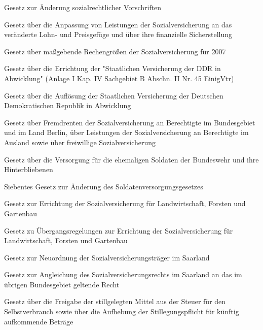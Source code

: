 \item[{SVÄndG}] Gesetz zur Änderung sozialrechtlicher Vorschriften

\item[{SVAnpG}] Gesetz über die Anpassung von Leistungen der Sozialversicherung an das veränderte Lohn- und Preisgefüge und über ihre finanzielle Sicherstellung

\item[{SVBezGrG-2007}] Gesetz über maßgebende Rechengrößen der Sozialversicherung für 2007

\item[{SVDDRAbwG}] Gesetz über die Errichtung der "Staatlichen Versicherung der DDR in Abwicklung" (Anlage I Kap. IV Sachgebiet B Abschn. II Nr. 45 EinigVtr)

\item[{SVDDRAuflG}] Gesetz über die Auflösung der Staatlichen Versicherung der Deutschen Demokratischen Republik in Abwicklung

\item[{SVFAG}] Gesetz über Fremdrenten der Sozialversicherung an Berechtigte im Bundesgebiet und im Land Berlin, über Leistungen der Sozialversicherung an Berechtigte im Ausland sowie über freiwillige Sozialversicherung

\item[{SVG}] Gesetz über die Versorgung für die ehemaligen Soldaten der Bundeswehr und ihre Hinterbliebenen

\item[{SVGÄndG-7}] Siebentes Gesetz zur Änderung des Soldatenversorgungsgesetzes

\item[{SVLFGG}] Gesetz zur Errichtung der Sozialversicherung für Landwirtschaft, Forsten und Gartenbau

\item[{SVLFÜG}] Gesetz zu Übergangsregelungen zur Errichtung der Sozialversicherung für Landwirtschaft, Forsten und Gartenbau

\item[{SVOrgSaarG}] Gesetz zur Neuordnung der Sozialversicherungsträger im Saarland

\item[{SVSaarAnglG}] Gesetz zur Angleichung des Sozialversicherungsrechts im Saarland an das im übrigen Bundesgebiet geltende Recht

\item[{SVStFreigG}] Gesetz über die Freigabe der stillgelegten Mittel aus der Steuer für den Selbstverbrauch sowie über die Aufhebung der Stillegungspflicht für künftig aufkommende Beträge

